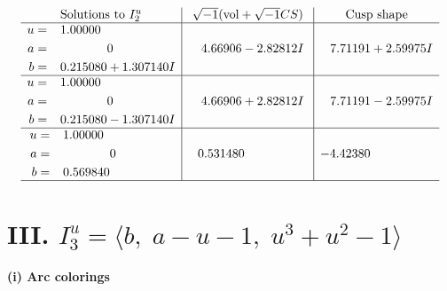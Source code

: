 \documentclass[1p]{elsarticle_modified}
\theoremstyle{definition}
\newcommand{\I}{\sqrt{-1}}
\begin{document}
$$\begin{array}{c|c|c}  
\text{Solutions to }I^u_{2}& \I (\text{vol} + \sqrt{-1}CS) & \text{Cusp shape}\\
 \hline 
\begin{aligned}
u &= \phantom{-}1.00000\phantom{ +0.000000I} \\
a &= \phantom{-0.000000 } 0 \\
b &= \phantom{-}0.215080 + 1.307140 I\end{aligned}
 & \phantom{-}4.66906 - 2.82812 I & \phantom{-}7.71191 + 2.59975 I \\ \hline\begin{aligned}
u &= \phantom{-}1.00000\phantom{ +0.000000I} \\
a &= \phantom{-0.000000 } 0 \\
b &= \phantom{-}0.215080 - 1.307140 I\end{aligned}
 & \phantom{-}4.66906 + 2.82812 I & \phantom{-}7.71191 - 2.59975 I \\ \hline\begin{aligned}
u &= \phantom{-}1.00000\phantom{ +0.000000I} \\
a &= \phantom{-0.000000 } 0 \\
b &= \phantom{-}0.569840\phantom{ +0.000000I}\end{aligned}
 & \phantom{-}0.531480\phantom{ +0.000000I} & -4.42380\phantom{ +0.000000I}\\
 \hline 
 \end{array}$$\newpage\newpage\renewcommand{\arraystretch}{1}
\centering \section*{III. $I^u_{3}= \langle b,\;a- u-1,\;u^3+u^2-1 \rangle$}
\flushleft \textbf{(i) Arc colorings}\\
\end{document}
